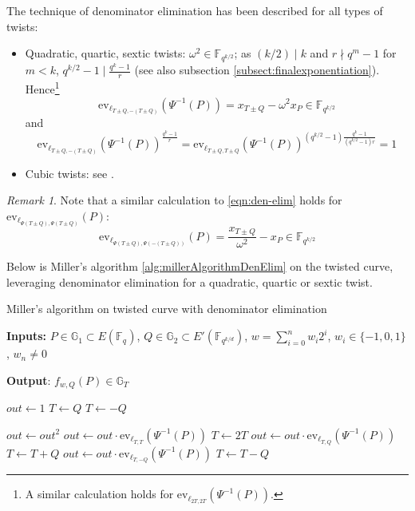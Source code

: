 \documentclass{article}
\newcommand{\gOne}{\mathbb{G}_1}
\newcommand{\gTwo}{\mathbb{G}_2}
\newcommand{\gT}{\mathbb{G}_T}
\newcommand{\ev}{\mathrm{ev}}
\newcommand{\fq}[1]{\mathbb{F}_{q^{#1}}}
\theoremstyle{remark}
\newtheorem{remark}{Remark}[section]
\theoremstyle{plain}
\begin{document}
The technique of denominator elimination has been described for all types of twists:
\begin{itemize}
    \item Quadratic, quartic, sextic twists: $\omega^2 \in \fq{k/2}$; as $(k/2) \mid k$ and $r \nmid q^m - 1$ for $m < k$, $q^{k/2} - 1 \mid \frac{q^k - 1}{r}$ (see also subsection \ref{subsect:finalexponentiation}). Hence\footnote{A similar calculation holds for $\ev_{\ell_{2T,2T}}(\Psi^{-1}(P))$.}
    \begin{equation}
        \label{eqn:den-elim}
        \ev_{\ell_{T \pm Q, - (T \pm Q) }}(\Psi^{-1}(P)) = x_{T \pm Q} - \omega^2 x_P \in \fq{k/2}
    \end{equation}
    and
    \[
        \ev_{\ell_{T \pm Q, - (T \pm Q)}}(\Psi^{-1}(P))^{\frac{q^k-1}{r}} = \ev_{\ell_{T \pm Q, T \pm Q}}(\Psi^{-1}(P))^{(q^{k/2}-1)\frac{q^k-1}{(q^{k/2}-1)r}} = 1
    \]
    \item Cubic twists: see \cite[Lem. 1]{LZZW-cubic-den-elim}.
\end{itemize}

\begin{remark}
    Note that a similar calculation to \eqref{eqn:den-elim} holds for $\ev_{\ell_{\Psi(T \pm Q), \Psi(T \pm Q)}}(P)$:
    \[
        \ev_{\ell_{\Psi(T \pm Q), \Psi(-(T \pm Q))}}(P) = \frac{x_{T \pm Q}}{\omega^2} - x_P \in \fq{k/2}
    \]
\end{remark}

Below is Miller's algorithm \eqref{alg:millerAlgorithmDenElim} on the twisted curve, leveraging denominator elimination for a quadratic, quartic or sextic twist.
\begin{algorithm}
    \caption{\small Miller's algorithm on twisted curve with denominator elimination}\label{alg:millerAlgorithmDenElim}
    \textbf{Inputs:} $P \in \gOne \subset E(\fq{})$, $Q \in \gTwo \subset E'(\fq{k/d})$, $w = \sum_{i=0}^n w_i 2^i$, $w_i \in \{-1,0,1\}$, $w_n \neq 0$

    \textbf{Output}: $f_{w,Q}(P) \in \gT$
    \begin{algorithmic}
        \State $out \gets 1$
            \State $T \gets Q$
        \Else
            \State $T \gets -Q$
        \EndIf

        \State $out \gets out^2$
        \State $out \gets out \cdot \ev_{\ell_{T,T}}(\Psi^{-1}(P))$
        \State $T \gets 2T$
            \State $out \gets out \cdot \ev_{\ell_{T,Q}}(\Psi^{-1}(P))$
            \State $T \gets T + Q$
        \Else
            \State $out \gets out \cdot \ev_{\ell_{T,-Q}}(\Psi^{-1}(P))$
            \State $T \gets T - Q$
        \EndIf
        \EndFor
    \end{algorithmic}
\end{algorithm}
\end{document}
